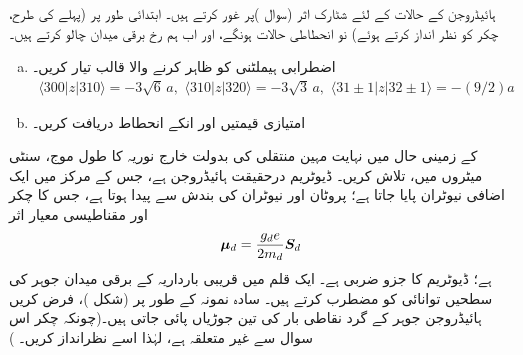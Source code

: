  ہائیڈروجن کے  حالات کے لئے شٹارک اثر (سوال )پر غور کرتے ہیں۔ ابتدائی طور پر (پہلے کی طرح، چکر کو نظر انداز کرتے ہوئے) نو انحطاطی حالات 
 ہونگے، اور اب ہم  رخ برقی میدان چالو کرتے ہیں۔
\begin{enumerate}[a.]
\item
اضطرابی ہیملٹنی کو ظاہر کرنے والا  قالب تیار کریں۔ 
\begin{align*}
\langle 300|z|310\rangle =-3\sqrt{6}\,a,\,\,\langle 310|z|320\rangle =-3\sqrt{3}\,a,\,\,\langle 31\pm1|z|32\pm1\rangle=-(9/2)a
\end{align*}
\item 
امتیازی قیمتیں اور انکے انحطاط دریافت کریں۔ 
\end{enumerate}
 کے زمینی حال  میں نہایت مہین منتقلی کی بدولت خارج نوریہ کا طول موج، سنٹی میٹروں میں، تلاش کریں۔ ڈیوٹریم درحقیقت  ہائیڈروجن ہے، جس کے مرکز میں ایک اضافی نیوٹران پایا جاتا ہے؛ پروٹان اور نیوٹران کی بندش سے  پیدا ہوتا ہے، جس کا چکر  اور مقناطیسی معیار اثر
\begin{align*}
{\ensuremath{{\boldsymbol{\mu}}}}_{d}=\frac{g_{d}e}{2m_{d}}{{\boldsymbol{S}}}_{d}
\end{align*}
ہے؛ ڈیوٹریم کا  جزو ضربی  ہے۔
 ایک قلم میں قریبی بارداریہ کے برقی میدان جوہر کی سطحیں توانائی کو مضطرب کرتے ہیں۔ سادہ نمونہ کے طور پر (شکل )، فرض کریں ہائیڈروجن جوہر کے گرد نقاطی بار کی تین جوڑیاں پائی جاتی ہیں۔(چونکہ چکر اس سوال سے غیر متعلقہ ہے، لہٰذا اسے نظرانداز کریں۔ )
 
